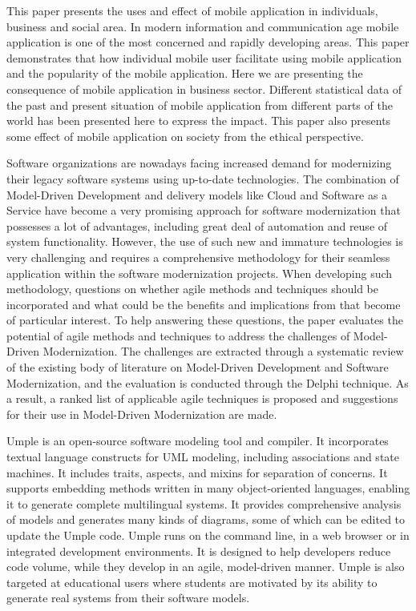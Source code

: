\documentclass{article}
\begin{document}
\medskip

This paper presents the uses and effect of mobile
application in individuals, business and social area. In modern
information and communication age mobile application is one of
the most concerned and rapidly developing areas. This paper
demonstrates that how individual mobile user facilitate using
mobile application and the popularity of the mobile application.
Here we are presenting the consequence of mobile application in
business sector. Different statistical data of the past and present
situation of mobile application from different parts of the world
has been presented here to express the impact. This paper also
presents some effect of mobile application on society from the
ethical perspective. \cite{islam2010mobile}

\newpage

\medskip

Software organizations are nowadays facing increased demand for modernizing their legacy software
systems using up-to-date technologies. The combination of Model-Driven Development and delivery
models like Cloud and Software as a Service have become a very promising approach for software
modernization that possesses a lot of advantages, including great deal of automation and reuse of system
functionality. However, the use of such new and immature technologies is very challenging and requires a
comprehensive methodology for their seamless application within the software modernization projects.
When developing such methodology, questions on whether agile methods and techniques should be
incorporated and what could be the benefits and implications from that become of particular interest. To
help answering these questions, the paper evaluates the potential of agile methods and techniques to address
the challenges of Model-Driven Modernization. The challenges are extracted through a systematic review of
the existing body of literature on Model-Driven Development and Software Modernization, and the
evaluation is conducted through the Delphi technique. As a result, a ranked list of applicable agile
techniques is proposed and suggestions for their use in Model-Driven Modernization are made.\cite{stavru2013challenges}


\medskip

Umple is an open-source software modeling tool and compiler. It incorporates textual language constructs for UML modeling, including associations and state machines. It includes traits, aspects, and mixins for separation of concerns. It supports embedding methods written in many object-oriented languages, enabling it to generate complete multilingual systems. It provides comprehensive analysis of models and generates many kinds of diagrams, some of which can be edited to update the Umple code. Umple runs on the command line, in a web browser or in integrated development environments. It is designed to help developers reduce code volume, while they develop in an agile, model-driven manner. Umple is also targeted at educational users where students are motivated by its ability to generate real systems from their software models. \cite{lethbridge2021umple}
\end{document}
